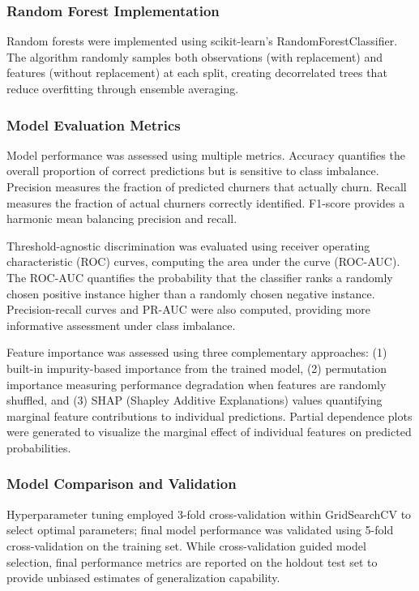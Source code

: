\documentclass[12pt]{article}
\begin{document}
\subsubsection{Random Forest Implementation}
Random forests were implemented using scikit-learn's RandomForestClassifier. The algorithm randomly samples both observations (with replacement) and features (without replacement) at each split, creating decorrelated trees that reduce overfitting through ensemble averaging.

\subsubsection{Model Evaluation Metrics}
Model performance was assessed using multiple metrics. Accuracy quantifies the overall proportion of correct predictions but is sensitive to class imbalance. Precision measures the fraction of predicted churners that actually churn. Recall measures the fraction of actual churners correctly identified. F1-score provides a harmonic mean balancing precision and recall.

Threshold-agnostic discrimination was evaluated using receiver operating characteristic (ROC) curves, computing the area under the curve (ROC-AUC). The ROC-AUC quantifies the probability that the classifier ranks a randomly chosen positive instance higher than a randomly chosen negative instance. Precision-recall curves and PR-AUC were also computed, providing more informative assessment under class imbalance.

Feature importance was assessed using three complementary approaches: (1) built-in impurity-based importance from the trained model, (2) permutation importance measuring performance degradation when features are randomly shuffled, and (3) SHAP (Shapley Additive Explanations) values quantifying marginal feature contributions to individual predictions. Partial dependence plots were generated to visualize the marginal effect of individual features on predicted probabilities.

\subsubsection{Model Comparison and Validation}
Hyperparameter tuning employed 3-fold cross-validation within GridSearchCV to select optimal parameters; final model performance was validated using 5-fold cross-validation on the training set. While cross-validation guided model selection, final performance metrics are reported on the holdout test set to provide unbiased estimates of generalization capability.
\end{document}
